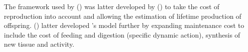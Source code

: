 \documentclass[a4paper, 11pt, hidelinks]{article} %
\begin{document}
	The framework used by \citeauthor{West2001} (\citeyear{West2001}) was latter developed by \citeauthor{Charnov2001} (\citeyear{Charnov2001}) to take the cost of reproduction into account and allowing the estimation of lifetime production of offspring.  \citeauthor{Hou2008} (\citeyear{Hou2008}) latter developed \citeauthor{West2001}'s model further by expanding maintenance cost to include the cost of feeding and digestion (specific dynamic action), synthesis of new tissue and activity.
	
	
\end{document}
